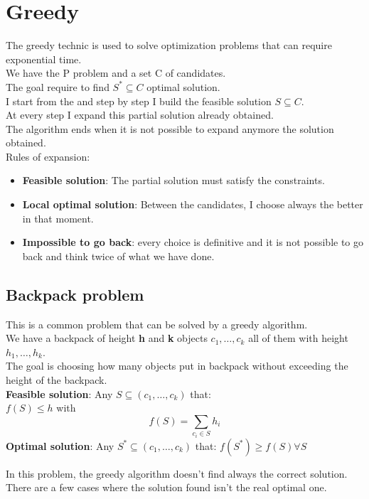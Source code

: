 \documentclass{article}
\begin{document}
\section{Greedy}
The greedy technic is used to solve optimization problems that can require exponential time.\\
We have the P problem and a set C of candidates.\\
The goal require to find $S^* \subseteq C$ optimal solution.\\
I start from the \emptyset and step by step I build the feasible solution $S \subseteq C$.\\
At every step I expand this partial solution already obtained.\\
The algorithm ends when it is not possible to expand anymore the solution obtained.\\
Rules of expansion:\\
\begin{itemize}
\item \textbf{Feasible solution}: The partial solution must satisfy the constraints.
\item \textbf{Local optimal solution}: Between the candidates, I choose always the better in that moment.
\item \textbf{Impossible to go back}: every choice is definitive and it is not possible to go back and think twice of what we have done.
\end{itemize}
\subsection{Backpack problem}
This is a common problem that can be solved by a greedy algorithm.\\
We have a backpack of height \textbf{h} and \textbf{k} objects $c_1,\ldots,c_k$ all of them with height $h_1,\ldots,h_k$.\\
The goal is choosing how many objects put in backpack without exceeding the height of the backpack.\\
\textbf{Feasible solution}: Any $S \subseteq \left(c_1,\ldots,c_k\right)$ that:\\
$f(S) \leq h$ with $$f(S) = \sum_{c_i \in S} h_i$$
\textbf{Optimal solution}: Any $S^* \subseteq \left(c_1,\ldots,c_k\right)$ that: $f(S^*) \geq f(S) \forall S$

In this problem, the greedy algorithm doesn't find always the correct solution. There are a few cases where the solution found isn't the real optimal one.
\end{document}

